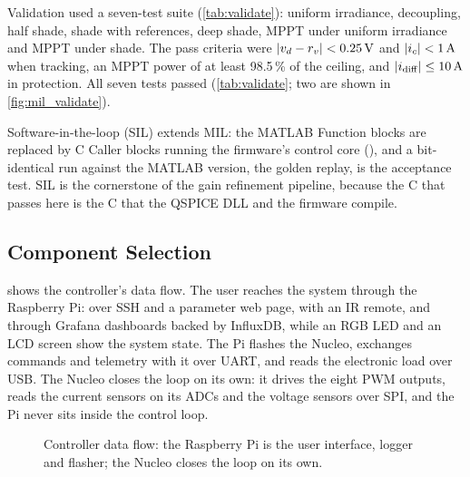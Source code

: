 Validation used a seven-test suite (\cref{tab:validate}): uniform irradiance, decoupling, half shade, shade with references, deep shade, MPPT under uniform irradiance and MPPT under shade. The pass criteria were $|v_{d} - r_v| < 0.25\,\mathrm{V}$ and $|i_{c}| < 1\,\mathrm{A}$ when tracking, an MPPT power of at least 98.5\,\% of the ceiling, and $|i_{\mathrm{diff}}| \le 10\,\mathrm{A}$ in protection. All seven tests passed (\cref{tab:validate}; two are shown in \cref{fig:mil_validate}).

Software-in-the-loop (SIL) extends MIL: the MATLAB Function blocks are replaced by C Caller blocks running the firmware's control core (), and a bit-identical run against the MATLAB version, the golden replay, is the acceptance test. SIL is the cornerstone of the gain refinement pipeline, because the C that passes here is the C that the QSPICE DLL and the firmware compile.

\subsection{Component Selection}
\label{sec:components}
 shows the controller's data flow. The user reaches the system through the Raspberry Pi: over SSH and a parameter web page, with an IR remote, and through Grafana dashboards backed by InfluxDB, while an RGB LED and an LCD screen show the system state. The Pi flashes the Nucleo, exchanges commands and telemetry with it over UART, and reads the electronic load over USB. The Nucleo closes the loop on its own: it drives the eight PWM outputs, reads the current sensors on its ADCs and the voltage sensors over SPI, and the Pi never sits inside the control loop.

\begin{figure}[htbp]
  \centering
  
  \caption[{Controller data flow}]{Controller data flow: the Raspberry Pi is the user interface, logger and flasher; the Nucleo closes the loop on its own.}
  \label{fig:sysarch}
\end{figure}

